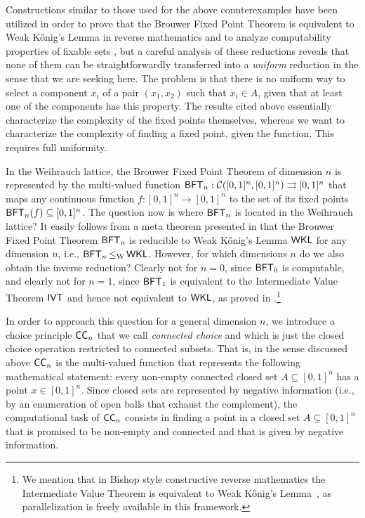 \documentclass[a4paper]{amsart}
\def\CC{{\mathcal C}}
\def\In{\subseteq}
\def\mto{\rightrightarrows}
\def\WKL{\text{\rm\sffamily WKL}}
\def\IVT{\text{\rm\sffamily IVT}}
\def\BFT{\mbox{\rm\sffamily BFT}}
\def\ConC{\mbox{\rm\sffamily CC}}
\def\leqW{\mathop{\leq_{\mathrm{W}}}}
\theoremstyle{definition}
\begin{document}
Constructions similar to those used for the above counterexamples 
have been utilized in order to prove that the Brouwer Fixed Point Theorem
is equivalent to Weak K\H{o}nig's Lemma in reverse mathematics \cite{Sim99,ST90,Koh05b}
and to analyze computability properties of fixable sets \cite{Mil02a},
but a careful analysis of these reductions reveals that none of them can be 
straightforwardly transferred into a {\em uniform} reduction in the sense that we are seeking here.
The problem is that there is no uniform way to select a component $x_i$ of a pair $(x_1,x_2)$ such that  $x_i\in A$, 
given that at least one of the components has this property.
The results cited above essentially characterize the complexity of the fixed points themselves, whereas we
want to characterize the complexity of finding a fixed point, given the function.
This requires full uniformity.

In the Weihrauch lattice, the Brouwer Fixed Point Theorem of dimension $n$ is represented by the 
multi-valued function $\BFT_n:\CC([0,1]^n,[0,1]^n)\mto[0,1]^n$ that maps any 
continuous function $f:[0,1]^n\to[0,1]^n$ to the set of its fixed points $\BFT_n(f)\In[0,1]^n$.
The question now is where $\BFT_n$ is located in the Weihrauch lattice? 
It easily follows from a meta theorem presented in \cite{BG11a} that the Brouwer Fixed Point Theorem $\BFT_n$ is
reducible to Weak K\H{o}nig's Lemma $\WKL$ for any dimension $n$, i.e., $\BFT_n\leqW\WKL$.
However, for which dimensions $n$ do we also obtain the inverse reduction?
Clearly not for $n=0$, since $\BFT_0$ is computable, and clearly not for $n=1$, since 
$\BFT_1$ is equivalent to the Intermediate Value Theorem $\IVT$ and hence not equivalent
to $\WKL$, as proved in \cite{BG11a}.\footnote{We mention that 
in Bishop style constructive reverse mathematics the Intermediate Value Theorem is equivalent to Weak K\H{o}nig's Lemma~\cite{Ish06}, as parallelization is freely available in this framework.} 

In order to approach this question for a general dimension $n$, 
we introduce a choice principle $\ConC_n$ that we call {\em connected choice}
and which is just the closed choice operation restricted to connected subsets. That is, in the sense discussed above $\ConC_n$
is the multi-valued function that  
represents the following mathematical statement: every non-empty connected closed set $A\In[0,1]^n$ has a point
$x\in[0,1]^n$. Since closed sets are represented by negative information (i.e., by an enumeration of open balls
that exhaust the complement), the computational task of $\ConC_n$ consists in finding a point in a closed set $A\In[0,1]^n$
that is promised to be non-empty and connected and that is given by negative information. 
\end{document}
